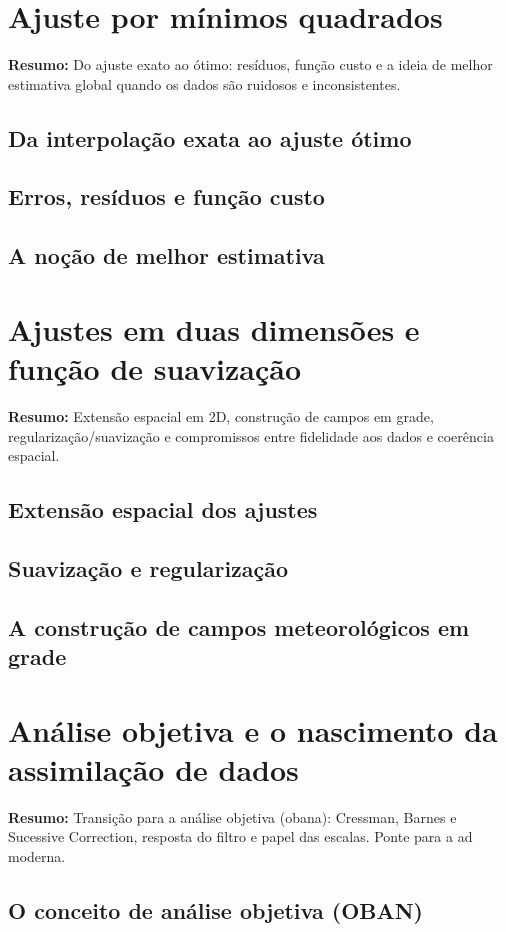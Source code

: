 \documentclass[12pt,a4paper,oneside]{book}
\begin{document}
\chapter{Ajuste por mínimos quadrados}
\noindent\textbf{Resumo:} Do ajuste exato ao ótimo: resíduos, função custo e a ideia de melhor estimativa global quando os dados são ruidosos e inconsistentes.
\section{Da interpolação exata ao ajuste ótimo}
\section{Erros, resíduos e função custo}
\section{A noção de melhor estimativa}

\chapter{Ajustes em duas dimensões e função de suavização}
\noindent\textbf{Resumo:} Extensão espacial em 2D, construção de campos em grade, regularização/suavização e compromissos entre fidelidade aos dados e coerência espacial.
\section{Extensão espacial dos ajustes}
\section{Suavização e regularização}
\section{A construção de campos meteorológicos em grade}

\chapter{Análise objetiva e o nascimento da assimilação de dados}
\noindent\textbf{Resumo:} Transição para a análise objetiva (\gls{obana}): Cressman, Barnes e Sucessive Correction, resposta do filtro e papel das escalas. Ponte para a \gls{ad} moderna.
\section{O conceito de análise objetiva (OBAN)}
\end{document}
